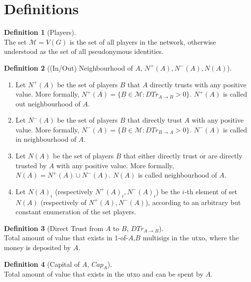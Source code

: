 \documentclass[11pt]{article}
\theoremstyle{definition}
\newtheorem{definition}{Definition}[section]
\theoremstyle{corollary}
\begin{document}
  \section{Definitions}
      \begin{definition}[Players] \ \\
         The set $\mathcal{M} = V(G)$ is the set of all players in the network, otherwise understood as the set of all
         pseudonymous identities.
      \end{definition}
      \begin{definition}[(In/Out) Neighbourhood of $A$, $N^{+}(A), N^{-}(A), N(A)$] \ 
         \begin{enumerate}
            \item Let $N^{+}(A)$ be the set of players $B$ that $A$ directly trusts with any positive value. More
               formally, $N^{+}(A) = \{B \in \mathcal{M} : DTr_{A \rightarrow B} > 0\}$. $N^{+}(A)$ is called out
               neighbourhood of $A$.
            \item Let $N^{-}(A)$ be the set of players $B$ that directly trust $A$ with any positive value. More
               formally, $N^{-}(A) = \{B \in \mathcal{M} : DTr_{B \rightarrow A} > 0\}$. $N^{-}(A)$ is called in
               neighbourhood of $A$.
            \item Let $N(A)$ be the set of players $B$ that either directly trust or are directly trusted by $A$ with
               any positive value. More formally, $N(A) = N^{+}(A) \cup N^{-}(A)$. $N(A)$ is called
               neighbourhood of $A$.
            \item Let $N(A)_i$ (respectively $N^{+}(A)_i, N^{-}(A)_i$) be the $i$-th element of set $N(A)$
               (respectively of $N^{+}(A), N^{-}(A)$), according to an arbitrary but constant enumeration of
               the set players.
         \end{enumerate}
      \end{definition}
      \begin{definition}[Direct Trust from $A$ to $B$, $DTr_{A \rightarrow B}$] \ \\
         Total amount of value that exists in 1-of-$A$,$B$ multisigs in the utxo, where the money is deposited by $A$.
      \end{definition}
      \begin{definition}[Capital of $A$, $Cap_A$] \ \\
         Total amount of value that exists in the utxo and can be spent by $A$.
      \end{definition}
\end{document}
